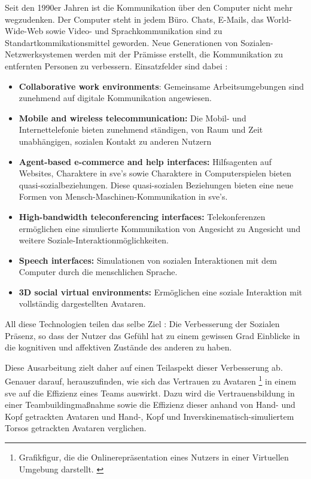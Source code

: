 \documentclass[a4paper,11pt]{article}%
\renewcommand{\\}{\vspace*{0.5\baselineskip} \newline}
\begin{document}
{	Seit den 1990er Jahren ist die Kommunikation über den Computer nicht mehr wegzudenken. Der Computer steht in jedem Büro. Chats, E-Mails, das World-Wide-Web sowie Video- und Sprachkommunikation sind zu Standartkommikationsmittel geworden. \citep[p. 14-16]{thurlow2004computer} \\ 
Neue Generationen von Sozialen-Netzwerksystemen werden mit der Prämisse erstellt, die Kommunikation zu entfernten Personen zu verbessern.
Einsatzfelder sind dabei :
\begin{itemize}
	\item{\textbf{Collaborative work environments}: Gemeinsame Arbeitsumgebungen sind zunehmend auf digitale Kommunikation angewiesen.}
	\item{\textbf{Mobile and wireless telecommunication:} Die Mobil- und Internettelefonie bieten zunehmend ständigen, von Raum und Zeit unabhängigen, sozialen Kontakt zu anderen Nutzern}
	\item{\textbf{Agent-based e-commerce and help interfaces:} Hilfsagenten auf Websites, Charaktere in \ac{sve}'s sowie Charaktere in Computerspielen bieten \flqq quasi\frqq-sozialbeziehungen. Diese \flqq quasi\frqq-sozialen Beziehungen bieten eine neue Formen von Mensch-Maschinen-Kommunikation in \ac{sve}'s.} 
	\item{\textbf{High-bandwidth teleconferencing interfaces:} Telekonferenzen ermöglichen eine simulierte Kommunikation von Angesicht zu Angesicht und weitere Soziale-Interaktionmöglichkeiten.}
	\item{\textbf{Speech interfaces:} Simulationen von sozialen Interaktionen mit dem Computer durch die menschlichen Sprache.}
	\item{\textbf{3D social virtual environments:} Ermöglichen eine soziale Interaktion mit vollständig dargestellten Avataren.}
\end{itemize}

All diese Technologien teilen das selbe Ziel : \flqq Die Verbesserung der Sozialen Präsenz, so dass der Nutzer das Gefühl hat zu einem gewissen Grad Einblicke in die kognitiven und affektiven Zustände des anderen zu haben.\frqq \citep{biocca2002defining} \citep[p.407–447]{biocca2001plugging} \\
	
Diese Ausarbeitung zielt daher auf einen Teilaspekt dieser Verbesserung ab. Genauer darauf, herauszufinden, wie sich das Vertrauen zu Avataren \footnote{Grafikfigur, die die Onlinerepräsentation eines Nutzers in einer Virtuellen Umgebung darstellt. \citep[p.1]{neustaedter2009presenting}} in einem \ac{sve} auf die Effizienz eines Teams auswirkt. Dazu wird die Vertrauensbildung in einer Teambuildingmaßnahme sowie die Effizienz dieser anhand von Hand- und Kopf getrackten Avataren und Hand-, Kopf und Inverskinematisch-simuliertem Torsos getrackten Avataren verglichen.	

}
\end{document}
